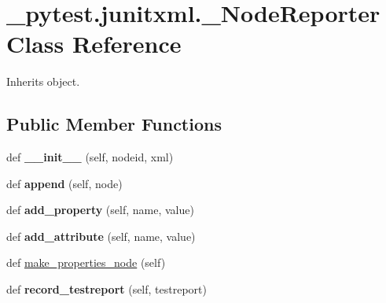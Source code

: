 \hypertarget{class__pytest_1_1junitxml_1_1___node_reporter}{}\section{\+\_\+pytest.\+junitxml.\+\_\+\+Node\+Reporter Class Reference}
\label{class__pytest_1_1junitxml_1_1___node_reporter}


Inherits object.

\subsection*{Public Member Functions}
\begin{DoxyCompactItemize}
\item 
\mbox{\label{class__pytest_1_1junitxml_1_1___node_reporter_a3158f3f0bbec5616647e9fa7d29603d9}} 
def {\bfseries \+\_\+\+\_\+init\+\_\+\+\_\+} (self, nodeid, xml)
\item 
\mbox{\label{class__pytest_1_1junitxml_1_1___node_reporter_a55a8ba75b16a3a41611cd9459a9b1b4b}} 
def {\bfseries append} (self, node)
\item 
\mbox{\label{class__pytest_1_1junitxml_1_1___node_reporter_a72ee6746c4671709289bcb90f443c6d1}} 
def {\bfseries add\+\_\+property} (self, name, value)
\item 
\mbox{\label{class__pytest_1_1junitxml_1_1___node_reporter_a8ed3e01f95a946efec3cce265e010da1}} 
def {\bfseries add\+\_\+attribute} (self, name, value)
\item 
def \hyperlink{class__pytest_1_1junitxml_1_1___node_reporter_a932d1ec24b8dd56f1d751bd3ac172719}{make\+\_\+properties\+\_\+node} (self)
\item 
\mbox{\label{class__pytest_1_1junitxml_1_1___node_reporter_a3916a4674e3bf29b4f14c6a52ce00aa6}} 
def {\bfseries record\+\_\+testreport} (self, testreport)
\item 
\mbox{\label{class__pytest_1_1junitxml_1_1___node_reporter_a9f3bc1977f6b2c4b664caaec28e17273}} 

\end{DoxyCompactItemize}
